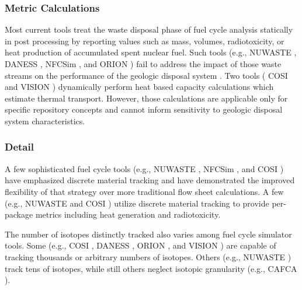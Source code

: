 \subsubsection{Metric Calculations}

Most current tools treat the waste disposal 
phase of fuel cycle analysis statically in post processing by reporting 
values such as mass, volumes, radiotoxicity, or heat production of accumulated 
spent nuclear fuel. Such tools 
(e.g.,
\gls{NUWASTE} \cite{abkowitz_nuclear_2010},
\gls{DANESS} \cite{yacout_daness_2011,van_den_durpel_daness:_2006}, 
\gls{NFCSim} \cite{schneider_nfcsim_2004}, and
ORION \cite{gregg_orion_2011}
) 
fail to address the impact of those waste streams on the performance of the 
geologic disposal system \cite{wilson_comparing_2011}.  Two tools (
\gls{COSI} \cite{boucher_international_2010} 
and 
\gls{VISION} \cite{yacout_vision_2006, wilson_comparing_2011, radel_repository_2007, boucher_international_2010}
) dynamically perform heat based capacity calculations which estimate thermal 
transport. However, those calculations are applicable only for specific 
repository concepts and cannot inform sensitivity to geologic disposal system characteristics.  

\subsubsection{Detail}

A few sophisticated fuel cycle tools  (e.g.,
\gls{NUWASTE} \cite{abkowitz_nuclear_2010},
\gls{NFCSim} \cite{schneider_nfcsim_2004}, and 
\gls{COSI} \cite{boucher_international_2010}) have emphasized discrete material 
tracking and have demonstrated the improved flexibility of that strategy over more 
traditional flow sheet calculations. A few (e.g., 
\gls{NUWASTE} \cite{abkowitz_nuclear_2010} and
\gls{COSI} \cite{boucher_international_2010}
) utilize discrete material tracking to 
provide per-package metrics including heat generation and radiotoxicity. 


The number of isotopes distinctly tracked also varies among fuel cycle 
simulator tools. Some (e.g., 
\gls{COSI} \cite{boucher_international_2010},
\gls{DANESS} \cite{yacout_daness_2011,van_den_durpel_daness:_2006}, 
ORION \cite{gregg_orion_2011}, and
\gls{VISION} \cite{yacout_vision_2006, wilson_comparing_2011, radel_repository_2007, boucher_international_2010}
) are capable of tracking thousands or arbitrary numbers of isotopes. Others (e.g., 
\gls{NUWASTE} \cite{abkowitz_nuclear_2010}) track tens of isotopes, while still 
others neglect isotopic granularity (e.g., 
\gls{CAFCA} \cite{guerin_impact_2009}).

